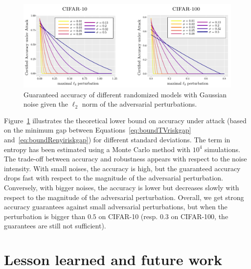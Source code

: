\begin{figure}[!ht]
\centering
    \includegraphics[width=\textwidth]{sections/appendix/mlj_rando/images/MinimalAccuracyUnderAttackCIFAR10andCIFAR100Gauss.pdf}
\caption{Guaranteed accuracy of different randomized models with Gaussian noise given the $\ell_2$ norm of the adversarial perturbations.}
\label{fig:GaussNoiseBound}
\end{figure}


Figure~\ref{fig:GaussNoiseBound} illustrates the theoretical lower bound on accuracy under attack  (based on the minimum gap between Equations~\eqref{eq:boundTVriskgap} and~\eqref{eq:boundRenyiriskgap}) for different standard deviations. The term in entropy has been estimated using a Monte Carlo method with $10^4$ simulations. The trade-off between accuracy and robustness appears with respect to the noise intensity. With small noises, the accuracy is high, but the guaranteed accuracy drops fast with respect to the magnitude of the adversarial perturbation. Conversely, with bigger noises, the accuracy is lower but decreases slowly with respect to the magnitude of the adversarial perturbation. Overall, we get strong accuracy guarantees against small adversarial perturbations, but when the perturbation is bigger than $0.5$ on CIFAR-10 (resp. $0.3$ on CIFAR-100, the guarantees are still not sufficient). 


\section{Lesson learned and future work}
\label{section::conclusion}


